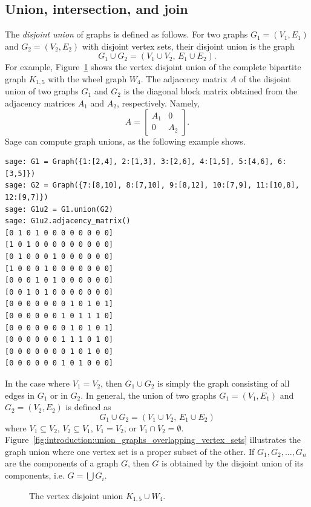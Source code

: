 \subsection{Union, intersection, and join}

The \emph{disjoint union} of graphs is defined as follows. For two
graphs $G_1 = (V_1, E_1)$ and $G_2 = (V_2, E_2)$ with disjoint vertex
sets, their disjoint union is the graph
\[
G_1 \cup G_2
=
(V_1 \cup V_2,\, E_1 \cup E_2).
\]
For example,
Figure~\ref{fig:introduction:vertex_disjoint_union_K15_W4} shows the
vertex disjoint union of the complete bipartite graph $K_{1,5}$ with
the wheel graph $W_4$. The adjacency matrix $A$ of the disjoint union
of two graphs $G_1$ and $G_2$ is the diagonal block matrix obtained
from the adjacency matrices $A_1$ and $A_2$, respectively. Namely,
\[
A
=
\begin{bmatrix}
A_1 & 0 \\
0 & A_2
\end{bmatrix}.
\]
%
Sage can compute graph unions, as the following example shows.
%
\begin{lstlisting}
sage: G1 = Graph({1:[2,4], 2:[1,3], 3:[2,6], 4:[1,5], 5:[4,6], 6:[3,5]})
sage: G2 = Graph({7:[8,10], 8:[7,10], 9:[8,12], 10:[7,9], 11:[10,8], 12:[9,7]})
sage: G1u2 = G1.union(G2)
sage: G1u2.adjacency_matrix()
[0 1 0 1 0 0 0 0 0 0 0 0]
[1 0 1 0 0 0 0 0 0 0 0 0]
[0 1 0 0 0 1 0 0 0 0 0 0]
[1 0 0 0 1 0 0 0 0 0 0 0]
[0 0 0 1 0 1 0 0 0 0 0 0]
[0 0 1 0 1 0 0 0 0 0 0 0]
[0 0 0 0 0 0 0 1 0 1 0 1]
[0 0 0 0 0 0 1 0 1 1 1 0]
[0 0 0 0 0 0 0 1 0 1 0 1]
[0 0 0 0 0 0 1 1 1 0 1 0]
[0 0 0 0 0 0 0 1 0 1 0 0]
[0 0 0 0 0 0 1 0 1 0 0 0]
\end{lstlisting}
%
In the case where $V_1 = V_2$, then $G_1 \cup G_2$ is simply the graph
consisting of all edges in $G_1$ or in $G_2$. In general, the union of
two graphs $G_1 = (V_1, E_1)$ and $G_2 = (V_2, E_2)$ is defined as
\[
G_1 \cup G_2
=
(V_1 \cup V_2,\, E_1 \cup E_2)
\]
where $V_1 \subseteq V_2$, $V_2 \subseteq V_1$, $V_1 = V_2$, or
$V_1 \cap V_2 = \emptyset$.
Figure~\ref{fig:introduction:union_graphs_overlapping_vertex_sets}
illustrates the graph union where one vertex set is a proper subset of
the other. If $G_1, G_2, \dots, G_n$ are the components of a graph
$G$, then $G$ is obtained by the disjoint union of its
components, i.e. $G = \bigcup G_i$.

\begin{figure}[!htbp]
\centering

\caption{The vertex disjoint union $K_{1,5} \cup W_4$.}
\label{fig:introduction:vertex_disjoint_union_K15_W4}
\end{figure}

